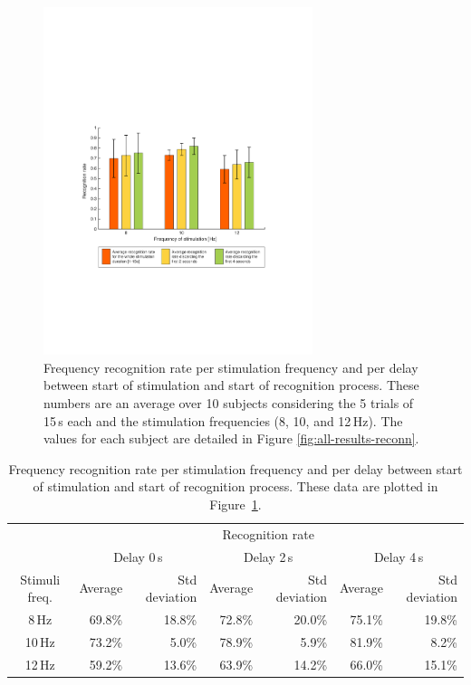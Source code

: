 \documentclass[smallextended]{svjour3}
\begin{document}
\begin{figure}
\center
\includegraphics[width=0.7\textwidth]{figures/taux-reconn.pdf}
\caption{Frequency recognition rate per stimulation frequency and per delay between start of stimulation and start of recognition process. These numbers are an average over 10 subjects considering the 5 trials of 15\,s each and the stimulation frequencies (8, 10, and 12\,Hz). The values for each subject are detailed in Figure \ref{fig:all-results-reconn}.}
\label{fig:taux-reconn}
\end{figure}

\begin{table}\begin{center}
    \caption{Frequency recognition rate per stimulation frequency and per delay between start of stimulation and start of recognition process. These data are plotted in Figure~\ref{fig:taux-reconn}.}
    \begin{tabular}{ c | r | r | r | r | r | r |}
        & \multicolumn{6}{c|}{Recognition rate} \\ 
        & \multicolumn{2}{c|}{Delay 0\,s} & \multicolumn{2}{c|}{Delay 2\,s} & \multicolumn{2}{c|}{Delay 4\,s} \\ 
        Stimuli freq.& Average & Std deviation & Average & Std deviation & Average & Std deviation \\ \hline

         8\,Hz & 69.8\% & 18.8\% & 72.8\% & 20.0\% & 75.1\% & 19.8\% \\
        10\,Hz & 73.2\% &  5.0\% & 78.9\% & 5.9\% & 81.9\% & 8.2\% \\
        12\,Hz & 59.2\% & 13.6\% & 63.9\% & 14.2\% & 66.0\% & 15.1\% \\ \hline
    \end{tabular}
\end{center}\end{table}
\end{document}
